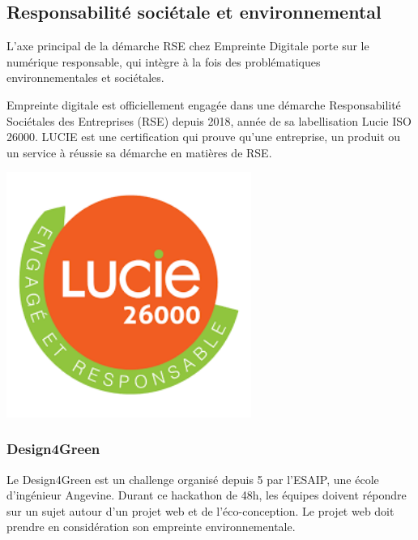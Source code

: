\documentclass[12pt]{article}
\begin{document}
\subsection{Responsabilité sociétale et environnemental}
L'axe principal de la démarche \gls{RSE} chez Empreinte Digitale porte sur le numérique responsable, qui intègre à la fois des problématiques environnementales et sociétales.

\noindent%
\begin{minipage}{.7\textwidth}%
Empreinte digitale est officiellement engagée dans une démarche Responsabilité Sociétales des Entreprises (\gls{RSE}) depuis 2018, année de sa labellisation Lucie \gls{ISO} 26000. 
LUCIE est une certification qui prouve qu'une entreprise, un produit ou un service à réussie sa démarche en matières de \gls{RSE}. \cite{Lucie}

\end{minipage}%
\hfill
\begin{minipage}{.3\textwidth}%
\begin{center}
\includegraphics[width=0.6\textwidth]{src/logo_lucie.png}
\end{center}
\end{minipage}%

\subsubsection{Design4Green}
Le Design4Green est un challenge organisé depuis 5 par l'ESAIP, une école d'ingénieur Angevine.
Durant ce hackathon de 48h, les équipes doivent répondre sur un sujet autour d'un projet web et de l'éco-conception.
Le projet web doit prendre en considération son empreinte environnementale.
\end{document}
